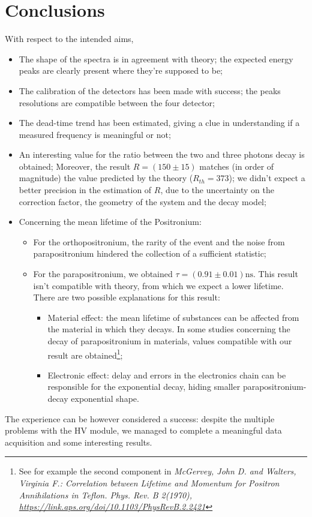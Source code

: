 \documentclass[11pt,a4 paper]{article}
\begin{document}
\section{Conclusions}
With respect to the intended aims,
\begin{itemize}[noitemsep]
    \item The shape of the spectra is in agreement with theory; the expected energy peaks are clearly present where they're supposed to be;
    \item The calibration of the detectors has been made with success; the peaks resolutions are compatible between the four detector;
    \item The dead-time trend has been estimated, giving a clue in understanding if a measured frequency is meaningful or not;
    \item An interesting value for the ratio between the two and three photons decay is obtained; Moreover, the result $R=(150\pm15)$ matches (in order of magnitude) the value predicted by the theory ($R_{th}=373$); we didn't expect a better precision in the estimation of $R$, due to the uncertainty on the correction factor, the geometry of the system and the decay model;
    \item Concerning the mean lifetime of the Positronium:
    \begin{itemize}[noitemsep]
        \item For the orthopositronium, the rarity of the event and the noise from parapositronium hindered the collection of a sufficient statistic;
        \item For the parapositronium, we obtained $\tau = ( 0.91 \pm 0.01) \si{\nano\second}$. This result isn't compatible with theory, from which we expect a lower lifetime. There are two possible explanations for this result:
        \begin{itemize}[noitemsep]
            \item Material effect: the mean lifetime of substances can be affected from the material in which they decays. In some studies concerning the decay of parapositronium in materials, values compatible with our result are obtained\footnote{See for example the second component in \emph{McGervey, John D. and Walters, Virginia F.: Correlation between Lifetime and Momentum for Positron Annihilations in Teflon. Phys. Rev. B 2(1970), \url{https://link.aps.org/doi/10.1103/PhysRevB.2.2421}}};
            \item Electronic effect: delay and errors in the electronics chain can be responsible for the exponential decay, hiding smaller parapositronium-decay exponential shape.
        \end{itemize}
    \end{itemize}
\end{itemize}

The experience can be however considered a success: despite the multiple problems with the HV module, we managed to complete a meaningful data acquisition and some interesting results.
\end{document}

